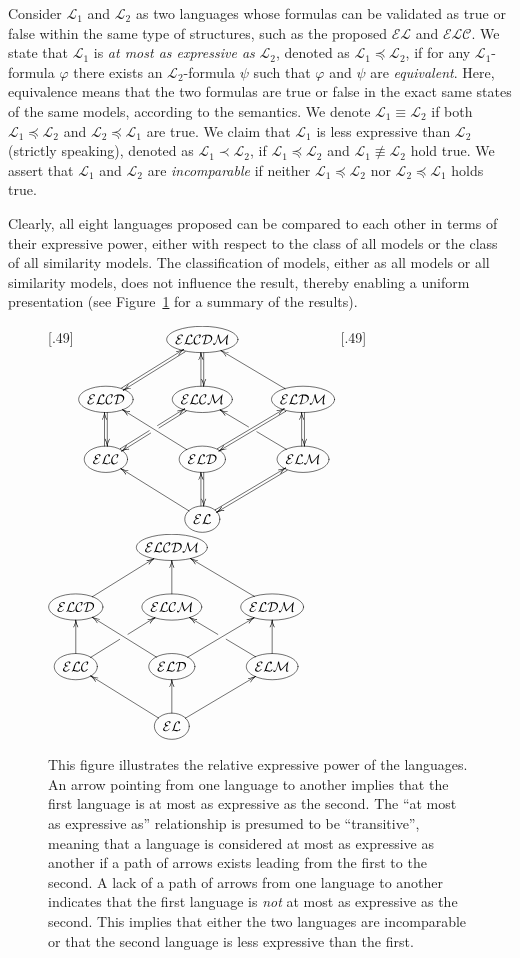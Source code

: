 \documentclass{article}
\newcommand{\ag}{\text{\normalfont\textsf{Ag}}\xspace}
\renewcommand{\phi}{\varphi}
\newcommand{\lang}{\ensuremath{\mathcal{EL}}\xspace}
\newcommand{\langc}{\ensuremath{\mathcal{ELC}}\xspace}
\newcommand{\langd}{\ensuremath{\mathcal{ELD}}\xspace}
\newcommand{\langm}{\ensuremath{\mathcal{ELM}}\xspace}
\newcommand{\langcd}{\ensuremath{\mathcal{ELCD}}\xspace}
\newcommand{\langcm}{\ensuremath{\mathcal{ELCM}}\xspace}
\newcommand{\langdm}{\ensuremath{\mathcal{ELDM}}\xspace}
\newcommand{\langcdm}{\ensuremath{\mathcal{ELCDM}}\xspace}
\newcommand{\langl}{\ensuremath{\mathcal{L}}\xspace}
\begin{document}
Consider $\langl_1$ and $\langl_2$ as two languages whose formulas can be validated as true or false within the same type of structures, such as the proposed \lang and \langc. We state that $\langl_1$ is \emph{at most as expressive as} $\langl_2$, denoted as $\langl_1 \preceq \langl_2$, if for any $\langl_1$-formula $\phi$ there exists an $\langl_2$-formula $\psi$ such that $\phi$ and $\psi$ are \emph{equivalent}. Here, equivalence means that the two formulas are true or false in the exact same states of the same models, according to the semantics. We denote $\langl_1 \equiv \langl_2$ if both $\langl_1 \preceq \langl_2$ and $\langl_2 \preceq \langl_1$ are true. We claim that $\langl_1$ is less expressive than $\langl_2$ (strictly speaking), denoted as $\langl_1 \prec \langl_2$, if $\langl_1 \preceq \langl_2$ and $\langl_1 \not\equiv \langl_2$ hold true. We assert that $\langl_1$ and $\langl_2$ are \emph{incomparable} if neither $\langl_1 \preceq \langl_2$ nor $\langl_2 \preceq \langl_1$ holds true.

Clearly, all eight languages proposed can be compared to each other in terms of their expressive power, either with respect to the class of all models or the class of all similarity models. The classification of models, either as all models or all similarity models, does not influence the result, thereby enabling a uniform presentation (see Figure~\ref{fig:expressivty} for a summary of the results).


\begin{figure}[htbp]
\footnotesize
\subcaptionbox{when $|\ag|=1$}[.49\textwidth]{
$\xymatrix{
&*++o[F]{\langcdm}\ar@<1pt>[dl]\ar@<1pt>[d]
\\
*++o[F]{\langcd}\ar@<1pt>[ur]\ar@<1pt>[d]&
*++o[F]{\langcm}\ar@<1pt>[u]\ar@<1pt>[dl]|(.5)\hole&
*++o[F]{\langdm}\ar[ul]\ar@<1pt>[dl]\ar@<1pt>[d]
\\
*++o[F]{\langc}\ar@<1pt>[u]\ar@<1pt>[ur]|(.5)\hole&
*++o[F]{\langd}\ar[ul]\ar@<1pt>[ur]\ar@<1pt>[d]&
*++o[F]{\langm}\ar[ul]|(.5)\hole\ar@<1pt>[u]\ar@<1pt>[dl]
\\
&*++o[F]{\lang}\ar[ul]\ar@<1pt>[u]\ar@<1pt>[ur]
}$
}
\subcaptionbox{when $|\ag| \geq 2$}[.49\textwidth]{
$\xymatrix{
&*++o[F]{\langcdm}
\\
*++o[F]{\langcd}\ar[ur]&*++o[F]{\langcm}\ar[u]&*++o[F]{\langdm}\ar[ul]
\\
*++o[F]{\langc}\ar[u]\ar[ur]|(.5)\hole&*++o[F]{\langd}\ar[ul]\ar[ur]&*++o[F]{\langm}\ar[ul]|(.5)\hole\ar[u]
\\
&*++o[F]{\lang}\ar[ul]\ar[u]\ar[ur]
}$
}
\caption{This figure illustrates the relative expressive power of the languages. An arrow pointing from one language to another implies that the first language is at most as expressive as the second. The ``at most as expressive as'' relationship is presumed to be ``transitive'', meaning that a language is considered at most as expressive as another if a path of arrows exists leading from the first to the second. A lack of a path of arrows from one language to another indicates that the first language is \emph{not} at most as expressive as the second. This implies that either the two languages are incomparable or that the second language is less expressive than the first.\label{fig:expressivty}}
\end{figure}
\end{document}
